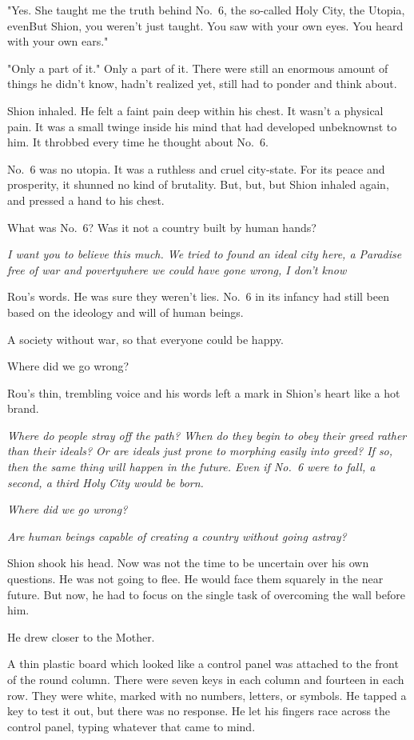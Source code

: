 "Yes. She taught me the truth behind No.~6, the so-called Holy City, the
Utopia, even\el But Shion, you weren't just taught. You saw with your
own eyes. You heard with your own ears."

"Only a part of it." Only a part of it. There were still an enormous
amount of things he didn't know, hadn't realized yet, still had to
ponder and think about.

Shion inhaled. He felt a faint pain deep within his chest. It wasn't a
physical pain. It was a small twinge inside his mind that had developed
unbeknownst to him. It throbbed every time he thought about No.~6.

No.~6 was no utopia. It was a ruthless and cruel city-state. For its
peace and prosperity, it shunned no kind of brutality. But, but, but\el 
Shion inhaled again, and pressed a hand to his chest.

What was No.~6? Was it not a country built by human hands?

\emph{I want you to believe this much. We tried to found an ideal city here, a
Paradise free of war and poverty\el where we could have gone wrong, I
don't know\el }

Rou's words. He was sure they weren't lies. No.~6 in its infancy had
still been based on the ideology and will of human beings.

A society without war, so that everyone could be happy.

Where did we go wrong?

Rou's thin, trembling voice and his words left a mark in Shion's heart
like a hot brand.

\emph{Where do people stray off the path? When do they begin to obey their
greed rather than their ideals? Or are ideals just prone to morphing
easily into greed? If so, then the same thing will happen in the future.
Even if No.~6 were to fall, a second, a third Holy City would be born.}

\emph{Where did we go wrong?}

\emph{Are human beings capable of creating a country without going astray?}

Shion shook his head. Now was not the time to be uncertain over his own
questions. He was not going to flee. He would face them squarely in the
near future. But now, he had to focus on the single task of overcoming
the wall before him.

He drew closer to the Mother.

A thin plastic board which looked like a control panel was attached to
the front of the round column. There were seven keys in each column and
fourteen in each row. They were white, marked with no numbers, letters,
or symbols. He tapped a key to test it out, but there was no response.
He let his fingers race across the control panel, typing whatever that
came to mind.

